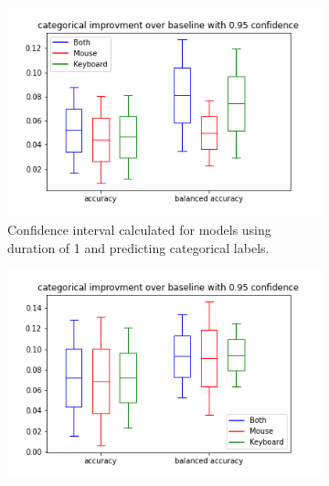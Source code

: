 \begin{figure}[!h]
    \centering


    \begin{subfigure}[b]{0.31\textwidth}
        \centering
        \includegraphics[width=\textwidth]{figures/results/interval_difference/1/1_categorical_0.95.png}
        \captionsetup{justification=centering}
        \caption{Confidence interval calculated for models using duration of 1 and predicting categorical labels.}
    \end{subfigure}
    \hfill
    \begin{subfigure}[b]{0.31\textwidth}
        \centering
        \includegraphics[width=\textwidth]{figures/results/interval_difference/5/5_categorical_0.95.png}
        \captionsetup{justification=centering}

\end{subfigure}
\end{figure}
